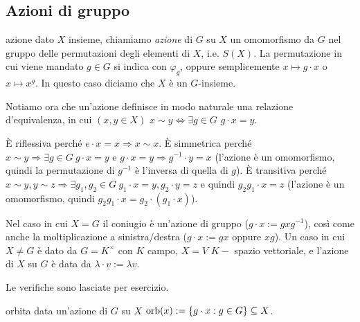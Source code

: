 \subsection{Azioni di gruppo}
\begin{definition}{azione}
    dato $X$ insieme, chiamiamo \emph{azione} di $G$ su $X$ un omomorfismo da $G$ nel gruppo delle permutazioni degli elementi di $X$, i.e. $S(X)$. La permutazione in cui viene mandato $g \in G$ si indica con $\varphi_g$, oppure semplicemente $x \mapsto g\cdot x$ o $x \mapsto x^g$. In questo caso diciamo che $X$ è un $G$-insieme.
\end{definition}

Notiamo ora che un'azione definisce in modo naturale una relazione d'equivalenza, in cui $(x,y \in X)$ $x \sim y \iff \exists g \in G$ $g\cdot x = y$. 
\begin{bdef}
    È riflessiva perché $e\cdot x = x \Rightarrow x \sim x$. È simmetrica perché $x \sim y \Rightarrow \exists g\in G \ g\cdot x = y$ e $g\cdot x = y \Rightarrow g^{-1} \cdot y = x$ (l'azione è un omomorfismo, quindi la permutazione di $g^{-1}$ è l'inversa di quella di $g$). È transitiva perché $x \sim y, y \sim z \Rightarrow \exists g_1,g_2\in G \ g_1\cdot x = y, g_2\cdot y = z$ e quindi $g_2g_1 \cdot x = z$ (l'azione è un omomorfismo, quindi $g_2g_1 \cdot x = g_2 \cdot(g_1 \cdot x)$).
\end{bdef}
\begin{example} Nel caso in cui $X=G$ il coniugio è un'azione di gruppo ($g \cdot x := gxg^{-1}$), così come anche la moltiplicazione a sinistra/destra ($g \cdot x := gx$ oppure $xg$). Un caso in cui $X \neq G$ è dato da $G = K^\times$ con $K$ campo, $X = V$ $K-$ spazio vettoriale, e l'azione di $X$ su $G$ è data da $\lambda \cdot \underline{v} :=  \lambda \underline{v} $.

Le verifiche sono lasciate per esercizio.
\end{example}

\begin{definition}{orbita}
    data un'azione di $G$ su $X$  $\text{orb}(x) := \{g \cdot x : g\in G\} \subseteq X$.
\end{definition} 

